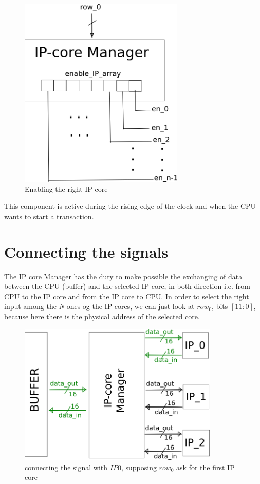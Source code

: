 \begin{figure}[h!]
	\centering	
	\includegraphics[width=0.7\textwidth]{imm/ip_func/enable_ip.png}  
	\caption{Enabling the right IP core} 
	\label{fig:en_IP}
\end{figure}
\bigskip
This component is active during the rising edge of the clock and when the CPU wants to start a transaction.
\clearpage
\section{Connecting the signals}
The IP core Manager has the duty to make possible the exchanging of data between the CPU (buffer) and the selected IP core, in both direction i.e. from CPU to the IP core and from the IP core to CPU.
In order to select the right input among the \textit{N} ones og the IP cores, we can just look at $ row_0 $, bits $ [11:0] $, because here there is the physical address of the selected core.
\bigskip

\begin{figure}[h!]
	\centering	
	\includegraphics[width=0.85\textwidth]{imm/ip_func/x_switch22.png}  
	\caption{connecting the signal with $ IP0 $, supposing $ row_0 $ ask for the first IP core} 
	\label{fig:x_switch1}
\end{figure}
\bigskip

